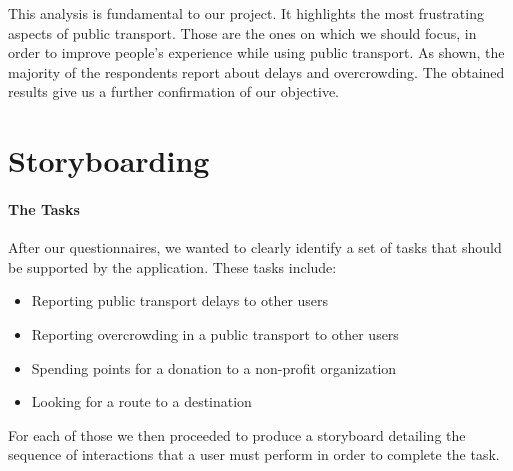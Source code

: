 \documentclass[a4paper, 11pt]{report}
\begin{document}
This analysis is fundamental to our project. It highlights the most frustrating aspects of public transport. 
Those are the ones on which we should focus, in order to improve people's experience while using public transport.
As shown, the majority of the respondents report about delays and overcrowding. The obtained results give us a further confirmation of our objective.


%
%

\section{Storyboarding}\label{sec:storyboarding}

\paragraph{The Tasks}

After our questionnaires, we wanted to clearly identify a set of tasks that should be
supported by the application. These tasks include:

\begin{itemize}\label{list:tasks}
	\item Reporting public transport delays to other users
	\item Reporting overcrowding in a public transport to other users
	\item Spending points for a donation to a non-profit organization
	\item Looking for a route to a destination
\end{itemize}

For each of those we then proceeded to produce a storyboard detailing the sequence of
interactions that a user must perform in order to complete the task.
\end{document}
